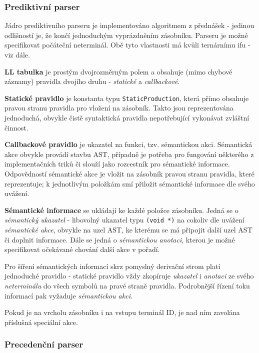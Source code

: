 \documentclass[11pt, a4paper]{article}
\begin{document}
\subsubsection{Prediktivní parser}

Jádro prediktivního parseru je implementováno algoritmem z přednášek - jedinou odlišností je, že končí jednoduchým vyprázdněním zásobníku. Parseru je možné specifikovat počáteční neterminál. Obě tyto vlastnosti má kvůli ternárnímu ifu - viz dále.

\textbf{LL tabulka} je prostým dvojrozměrným polem a obsahuje (mimo chybové záznamy) pravidla dvojího druhu - \emph{statické} a \emph{callbackové}.

\textbf{Statické pravidlo} je konstanta typu \texttt{StaticProduction}, která přímo obsahuje pravou stranu pravidla pro vložení na zásobník. Takto jsou reprezentována jednoduchá, obvykle čistě syntaktická pravidla nepotřebující vykonávat zvláštní činnost.

\textbf{Callbackové pravidlo} je ukazatel na funkci, tzv. sémantickou akci. Sémantická akce obvykle provádí stavbu AST, případně je potřeba pro fungování některého z implementačních triků či slouží jako rozcestník pro sémantické informace. Odpovědností sémantické akce je vložit na zásobník pravou stranu pravidla, které reprezentuje; k jednotlivým položkám smí přiložit sémantické informace dle svého uvážení.

\textbf{Sémantické informace} se ukládají ke každé položce zásobníku. Jedná se o \emph{sémantický ukazatel} - libovolný ukazatel typu \texttt{(void *)} na cokoliv dle uvážení \emph{sémantické akce}, obvykle na uzel AST, ke kterému se má připojit další uzel AST či doplnit informace. Dále se jedná o \emph{sémantickou anotaci}, kterou je možné specifikovat očekávané chování další akce v pořadí.

Pro šíření sémantických informací skrz pomyslný derivační strom platí jednoduché pravidlo - statické pravidlo vždy zkopíruje \emph{ukazatel} i \emph{anotaci} ze svého \emph{neterminálu} do všech symbolů na pravé straně pravidla. Podrobnější řízení toku informací pak vyžaduje \emph{sémantickou akci}.

Pokud je na vrcholu zásobníku i na vstupu terminál ID, je nad ním zavolána příslušná speciální akce.

\subsubsection{Precedenční parser}
\end{document}
